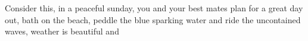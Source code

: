 Consider this, in a peaceful sunday, you and your best mates plan for a great day out, bath on the beach, peddle the blue sparking water and ride the uncontained waves, weather is beautiful and 